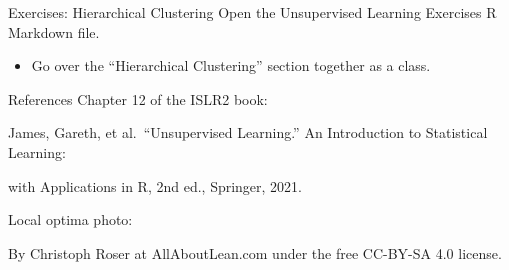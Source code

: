 \documentclass[
  ignorenonframetext,
  aspectratio=169,
]{beamer}
\providecommand{\tightlist}{%
  \setlength{\itemsep}{0pt}\setlength{\parskip}{0pt}}\usepackage{longtable,booktabs,array}
\begin{document}
\begin{frame}{Exercises: Hierarchical Clustering}
\protect\hypertarget{exercises-hierarchical-clustering}{}
Open the Unsupervised Learning Exercises R Markdown file.

\begin{itemize}
\tightlist
\item
  Go over the ``Hierarchical Clustering'' section together as a class.
\end{itemize}
\end{frame}

\begin{frame}{References}
\protect\hypertarget{references}{}
Chapter 12 of the ISLR2 book:

\quad James, Gareth, et al.~``Unsupervised Learning.'' An Introduction
to Statistical Learning:

\quad with Applications in R, 2nd ed., Springer, 2021.

Local optima photo:

\quad By Christoph Roser at AllAboutLean.com under the free CC-BY-SA 4.0
license.
\end{frame}
\end{document}
